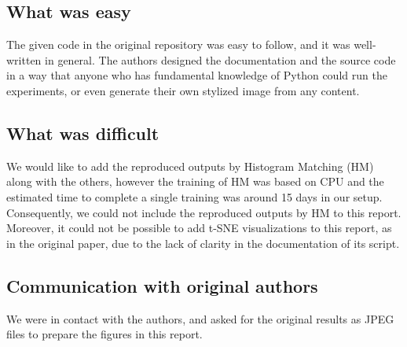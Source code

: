 \begin{table}[!t]
\centering
\caption{White-balance correction results of the recent methods \cite{kinli2023modeling} and its variant with EFDM on mixed-illuminant evaluation set \cite{Afifi_2022_WACV}.}
\label{tab:awb}
\end{table}

\subsection{What was easy}
The given code in the original repository was easy to follow, and it was well-written in general. The authors designed the documentation and the source code in a way that anyone who has fundamental knowledge of Python could run the experiments, or even generate their own stylized image from any content. %

\subsection{What was difficult}
We would like to add the reproduced outputs by Histogram Matching (HM) along with the others, however the training of HM was based on CPU and the estimated time to complete a single training was around 15 days in our setup. Consequently, we could not include the reproduced outputs by HM to this report. Moreover, it could not be possible to add t-SNE visualizations to this report, as in the original paper, due to the lack of clarity in the documentation of its script.   

\subsection{Communication with original authors}
We were in contact with the authors, and asked for
the original results as JPEG files to prepare the figures in this report.
